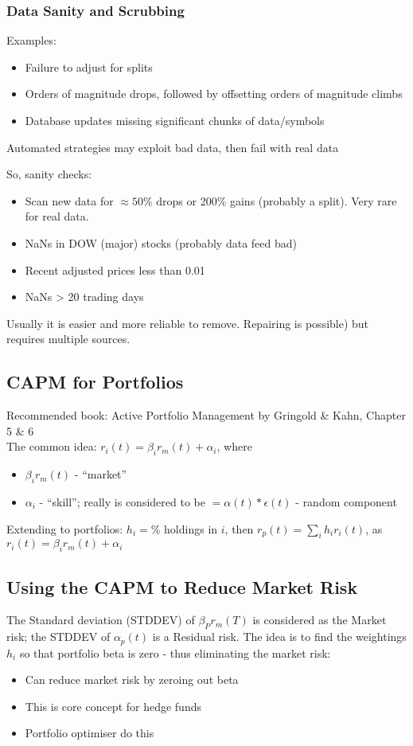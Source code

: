\documentclass{scrartcl}
\begin{document}
\subsubsection{Data Sanity and Scrubbing}
\label{sec:DataSanity}
Examples:
\begin{itemize}
\item Failure to adjust for splits
\item Orders of magnitude drops, followed by offsetting orders of magnitude
  climbs
\item Database updates missing significant chunks of data/symbols
\end{itemize}
Automated strategies may exploit bad data, then fail with real data

So, sanity checks:
\begin{itemize}
\item Scan new data for $\approx 50\%$ drops or 200\% gains (probably a split).
  Very rare for real data.
\item NaNs in DOW (major) stocks (probably data feed bad)
\item Recent adjusted prices less than 0.01
\item NaNs > 20 trading days
\end{itemize}

Usually it is easier and more reliable to remove. Repairing is possible) but
requires multiple sources. 

\subsection{CAPM for Portfolios}
\label{sec:7-4}
Recommended book: Active Portfolio Management by Gringold \& Kahn, Chapter 5 \& 6\\
The common idea: $r_i(t)  = \beta_i r_m(t) + \alpha_i$, where
\begin{itemize}
\item $\beta_i r_m(t)$ - ``market''
\item $\alpha_i$ - ``skill''; really is considered to be $=\alpha(t) *
  \epsilon(t)$ - random component
\end{itemize}
Extending to portfolios:
$h_i = $\% holdings in $i$, then $r_p(t) = \sum \limits_i h_i r_i(t)$, as
$r_i(t) = \beta_i r_m(t) + \alpha_i$

\subsection{Using the CAPM to Reduce Market Risk}
\label{sec:7-5}
The Standard deviation (STDDEV) of $\beta_P r_m(T)$ is considered as the Market
risk; the STDDEV of $\alpha_p(t)$ is a Residual risk. The idea is to find the
weightings $h_i$ so that portfolio beta is zero  - thus eliminating the market
risk:
\begin{itemize}
\item Can reduce market risk by zeroing out beta
\item This is core concept for hedge funds
\item Portfolio optimiser do this 
\end{itemize}
\end{document}

